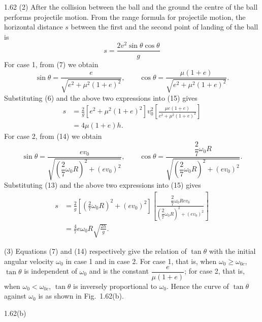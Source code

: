 \begin{solution}{1.62}
(2) After the collision between the ball and the ground the centre of the ball performs projectile motion. From the range formula for projectile motion, the horizontal distance $s$ between the first and the second point of landing of the ball is
\begin{equation}
s=\frac{2v^2\sin\theta\cos\theta}{g} \tag{15}
\end{equation}
For case 1, from (7) we obtain
\[
\sin\theta=\frac{e}{\sqrt{e^2+\mu^2(1+e)^2}},\qquad
\cos\theta=\frac{\mu(1+e)}{\sqrt{e^2+\mu^2(1+e)^2}}.
\]
Substituting (6) and the above two expressions into (15) gives
\[
\begin{aligned}
s&=\frac{2}{g}\left[e^2+\mu^2(1+e)^2\right]v_0^2\left[\frac{\mu e(1+e)}{e^2+\mu^2(1+e)^2}\right]\\
&=4\mu(1+e)h .
\end{aligned}
\]
For case 2, from (14) we obtain
\[
\sin\theta=\frac{ev_0}{\sqrt{\left(\dfrac{2}{7}\omega_0R\right)^2+\left(ev_0\right)^2}},\qquad
\cos\theta=\frac{\dfrac{2}{7}\omega_0R}{\sqrt{\left(\dfrac{2}{7}\omega_0R\right)^2+\left(ev_0\right)^2}}.
\]
Substituting (13) and the above two expressions into (15) gives
\[
\begin{aligned}
s&=\frac{2}{g}\left[\left(\frac{2}{7}\omega_0R\right)^2+\left(ev_0\right)^2\right]
\left[\frac{\dfrac{2}{7}\omega_0Rev_0}{\left(\dfrac{2}{7}\omega_0R\right)^2+\left(ev_0\right)^2}\right]\\
&=\frac{4}{7}e\omega_0R\sqrt{\frac{2h}{g}} .
\end{aligned}
\]

(3) Equations (7) and (14) respectively give the relation of $\tan\theta$ with the initial angular velocity $\omega_0$ in case 1 and in case 2. For case 1, that is, when $\omega_0\geq\omega_{0c}$, $\tan\theta$ is independent of $\omega_0$ and is the constant $\dfrac{e}{\mu(1+e)}$; for case 2, that is, when $\omega_0<\omega_{0c}$, $\tan\theta$ is inversely proportional to $\omega_0$. Hence the curve of $\tan\theta$ against $\omega_0$ is as shown in Fig.~1.62(b).

\begin{figbox}{1.62(b)}
\end{figbox}

\end{solution}

